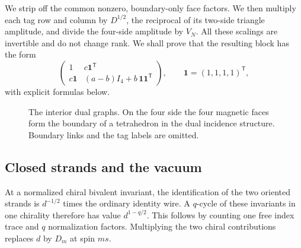 \documentclass[11pt]{article}
\theoremstyle{remark}
\begin{document}
We strip off the common nonzero, boundary-only face factors. We then multiply each tag row and column by \(D^{1/2}\), the reciprocal of its two-side triangle amplitude, and divide the four-side amplitude by \(V_N\). All these scalings are invertible and do not change rank. We shall prove that the resulting block has the form
\begin{equation}\label{eq:block}
 \begin{pmatrix}
 1 & c\mathbf{1}^{\mathsf T}\\
 c\mathbf{1} & (a-b)I_4+b\,\mathbf{1}\mathbf{1}^{\mathsf T}
 \end{pmatrix},
 \qquad \mathbf{1}=(1,1,1,1)^{\mathsf T},
\end{equation}
with explicit formulas below.


\begin{figure}[tb]
\centering
{}
\caption{The interior dual graphs. On the four side the four magnetic faces form the boundary of a tetrahedron in the dual incidence structure. Boundary links and the tag labels are omitted.}
\label{fig:duals}
\end{figure}

\subsection{Closed strands and the vacuum}

At a normalized chiral bivalent invariant, the identification of the two oriented strands is \(d^{-1/2}\) times the ordinary identity wire. A \(q\)-cycle of these invariants in one chirality therefore has value \(d^{1-q/2}\). This follows by counting one free index trace and \(q\) normalization factors. Multiplying the two chiral contributions replaces \(d\) by \(D_m\) at spin \(ms\).
\end{document}
